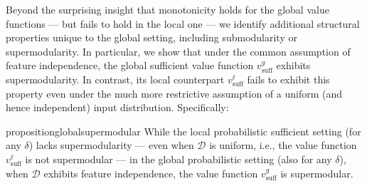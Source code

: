 \documentclass{article}
\begin{document}



Beyond the surprising insight that monotonicity holds for the global value functions --- but fails to hold in the local one --- we identify additional structural properties unique to the global setting, including submodularity or supermodularity. In particular, we show that under the common assumption of feature independence, the global sufficient value function $v^{g}_{\text{suff}}$ exhibits supermodularity. In contrast, its local counterpart $v^{\ell}_{\text{suff}}$ fails to exhibit this property even under the much more restrictive assumption of a uniform (and hence independent) input distribution. Specifically:

\begin{restatable}{proposition}{globalsupermodular} \label{globalsupermod_prop}
While the local probabilistic sufficient setting (for any $\delta$) lacks supermodularity --- even when $\mathcal{D}$ is uniform, i.e., the value function $v^{\ell}_{\text{suff}}$ is not supermodular --- in the global probabilistic setting (also for any $\delta$), when $\mathcal{D}$ exhibits feature independence, the value function $v^g_{\text{suff}}$ is supermodular.
\end{restatable}
\end{document}
